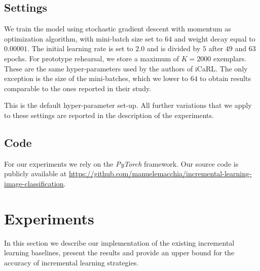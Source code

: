 \documentclass[10pt,twocolumn,letterpaper]{article}
\begin{document}
\subsection{Settings}
We train the model using stochastic gradient descent with momentum as optimization algorithm, with mini-batch size set to $64$ and weight decay equal to $0.00001$. The initial learning rate is set to $2.0$ and is divided by $5$ after $49$ and $63$ epochs. For prototype rehearsal, we store a maximum of $K=2000$ exemplars. These are the same hyper-parameters used by the authors of iCaRL. The only exception is the size of the mini-batches, which we lower to $64$ to obtain results comparable to the ones reported in their study.

This is the default hyper-parameter set-up. All further variations that we apply to these settings are reported in the description of the experiments.

\subsection{Code}
For our experiments we rely on the \emph{PyTorch} framework. Our source code is publicly available at
\url{https://github.com/manuelemacchia/incremental-learning-image-classification}.

\section{Experiments}
In this section we describe our implementation of the existing incremental learning baselines, present the results and provide an upper bound for the accuracy of incremental learning strategies.
\end{document}
